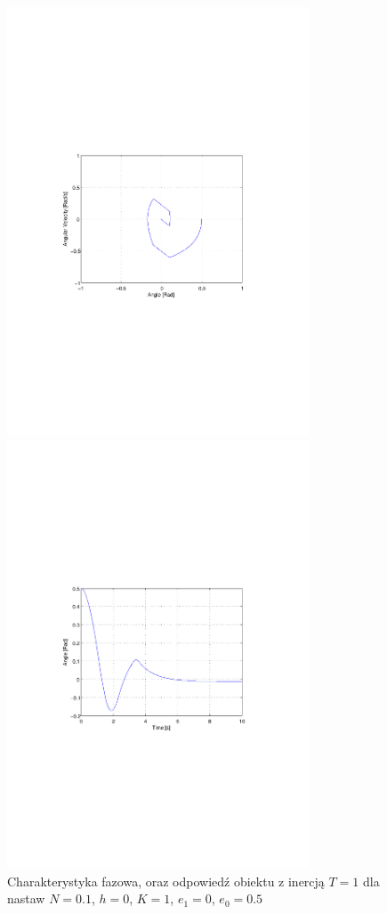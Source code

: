 \documentclass[12pt]{article}
\begin{document}
\begin{figure}[!htb]
	\begin{center}
		\includegraphics[trim=5cm 9cm 5cm 9cm,width=9cm]{../res/img/s1_T1_N0,1_h0_K1_e1-0_e0-0,5p.pdf}
	\end{center}
	
	\begin{center}
		\includegraphics[trim=5cm 9cm 5cm 9cm,width=9cm]{../res/img/s1_T1_N0,1_h0_K1_e1-0_e0-0,5r.pdf} 
	\end{center}
	\caption{Charakterystyka fazowa, oraz odpowiedź obiektu z inercją $T=1$ dla
	nastaw $N=0.1$, $h=0$, $K=1$, $e_1=0$, $e_0=0.5$}
\end{figure}
\end{document}
